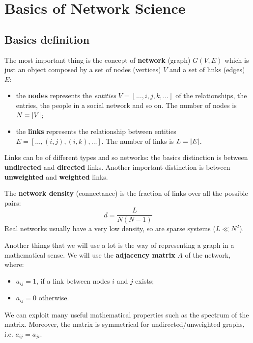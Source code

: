 \documentclass[../main/main.tex]{subfiles}
\begin{document}
\chapter{Basics of Network Science}


\section{Basics definition}

The most important thing is the concept of \textbf{network} (graph) \( G(V,E) \) which is just an object composed by a set of nodes (vertices) \( V \) and a set of links (edges) \( E \):
\begin{itemize}
\item the \textbf{nodes} represents the \emph{entities} \( V=[\dots,i,j,k,\dots] \) of the relationships, the entries, the people in a social network and so on. The number of nodes is \( N= \abs{V}  \);

\item the \textbf{links} represents the relationship between entities \( E=[\dots,(i,j),(i,k),\dots] \). The number of links is \( L= \abs{E}  \).
\end{itemize}

Links can be of different types and so networks: the basics distinction is between \textbf{undirected} and \textbf{directed} links.
Another important distinction is between \textbf{unweighted} and \textbf{weighted} links.

The \textbf{network density} (connectance) is the fraction of links over all the possible pairs:
\begin{equation}
  d = \frac{L}{N(N-1)}
\end{equation}
Real networks usually have a very low density, so are sparse systems (\( L \ll N^2 \)).

Another things that we will use a lot is the way of representing a graph in a mathematical sense. We will use the \textbf{adjacency matrix} \( A \) of the network, where:
\begin{itemize}
\item \( a_{ij} = 1 \), if a link between nodes \( i \) and \( j \) exists;
\item \( a_{ij} = 0 \) otherwise.
\end{itemize}
We can exploit many useful mathematical properties such as the spectrum of the matrix. Moreover, the matrix is symmetrical for undirected/unweighted graphs, i.e. \( a_{ij} = a_{ji} \).
\end{document}
